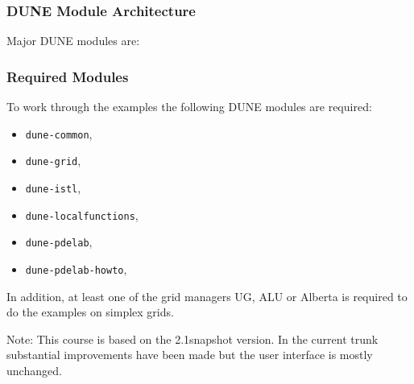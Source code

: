 \begin{frame}
\frametitle<presentation>{DUNE Module Architecture}
Major DUNE modules are:
\begin{center}
\end{center}
\end{frame}

\begin{frame}
\frametitle<presentation>{Required Modules}
To work through the examples the following DUNE modules are required: 
\begin{itemize}
\item \lstinline{dune-common},
\item \lstinline{dune-grid},
\item \lstinline{dune-istl},
\item \lstinline{dune-localfunctions},
\item \lstinline{dune-pdelab},
\item \lstinline{dune-pdelab-howto},
\end{itemize}

In addition, at least one of the grid managers UG, ALU or Alberta is
required to do the examples on simplex grids. 

Note: This course is based on the 2.1snapshot version. In the current trunk
substantial improvements have been made but the user interface is mostly unchanged.
\end{frame}



